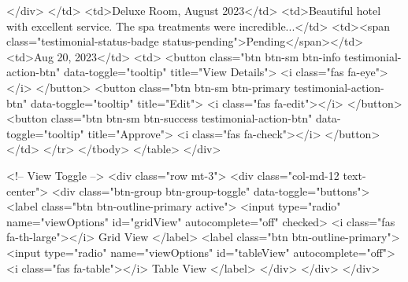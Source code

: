                                                     </div>
                                                </td>
                                                <td>Deluxe Room, August 2023</td>
                                                <td>Beautiful hotel with excellent service. The spa treatments were incredible...</td>
                                                <td><span class="testimonial-status-badge status-pending">Pending</span></td>
                                                <td>Aug 20, 2023</td>
                                                <td>
                                                    <button class="btn btn-sm btn-info testimonial-action-btn" data-toggle="tooltip" title="View Details">
                                                        <i class="fas fa-eye"></i>
                                                    </button>
                                                    <button class="btn btn-sm btn-primary testimonial-action-btn" data-toggle="tooltip" title="Edit">
                                                        <i class="fas fa-edit"></i>
                                                    </button>
                                                    <button class="btn btn-sm btn-success testimonial-action-btn" data-toggle="tooltip" title="Approve">
                                                        <i class="fas fa-check"></i>
                                                    </button>
                                                </td>
                                            </tr>
                                        </tbody>
                                    </table>
                                </div>

                                <!-- View Toggle -->
                                <div class="row mt-3">
                                    <div class="col-md-12 text-center">
                                        <div class="btn-group btn-group-toggle" data-toggle="buttons">
                                            <label class="btn btn-outline-primary active">
                                                <input type="radio" name="viewOptions" id="gridView" autocomplete="off" checked>
                                                <i class="fas fa-th-large"></i> Grid View
                                            </label>
                                            <label class="btn btn-outline-primary">
                                                <input type="radio" name="viewOptions" id="tableView" autocomplete="off">
                                                <i class="fas fa-table"></i> Table View
                                            </label>
                                        </div>
                                    </div>
                                </div>

